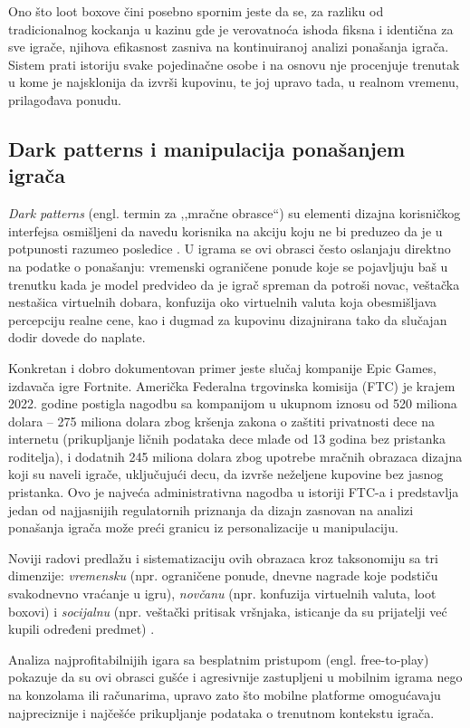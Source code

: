 \documentclass[12pt]{article}
\begin{document}
Ono što loot boxove čini posebno spornim jeste da se, za razliku od tradicionalnog kockanja u kazinu gde je verovatnoća ishoda fiksna i identična za sve igrače, njihova efikasnost zasniva na kontinuiranoj analizi ponašanja igrača. Sistem prati istoriju svake pojedinačne osobe i na osnovu nje procenjuje trenutak u kome je najsklonija da izvrši kupovinu, te joj upravo tada, u realnom vremenu, prilagođava ponudu.
\subsection{Dark patterns i manipulacija ponašanjem igrača}

\textit{Dark patterns} (engl. termin za ,,mračne obrasce``) su elementi dizajna korisničkog interfejsa osmišljeni da navedu korisnika na akciju koju ne bi preduzeo da je u potpunosti razumeo posledice \cite{ftc2022}. U igrama se ovi obrasci često oslanjaju direktno na podatke o ponašanju: vremenski ograničene ponude koje se pojavljuju baš u trenutku kada je model predvideo da je igrač spreman da potroši novac, veštačka nestašica virtuelnih dobara, konfuzija oko virtuelnih valuta koja obesmišljava percepciju realne cene, kao i dugmad za kupovinu dizajnirana tako da slučajan dodir dovede do naplate.

Konkretan i dobro dokumentovan primer jeste slučaj kompanije Epic Games, izdavača igre Fortnite. Američka Federalna trgovinska komisija (FTC) je krajem 2022. godine postigla nagodbu sa kompanijom u ukupnom iznosu od 520 miliona dolara -- 275 miliona dolara zbog kršenja zakona o zaštiti privatnosti dece na internetu (prikupljanje ličnih podataka dece mlađe od 13 godina bez pristanka roditelja), i dodatnih 245 miliona dolara zbog upotrebe mračnih obrazaca dizajna koji su naveli igrače, uključujući decu, da izvrše neželjene kupovine bez jasnog pristanka. Ovo je najveća administrativna nagodba u istoriji FTC-a i predstavlja jedan od najjasnijih regulatornih priznanja da dizajn zasnovan na analizi ponašanja igrača može preći granicu iz personalizacije u manipulaciju.

Noviji radovi predlažu i sistematizaciju ovih obrazaca kroz taksonomiju sa tri dimenzije: \textit{vremensku} (npr. ograničene ponude, dnevne nagrade koje podstiču svakodnevno vraćanje u igru), \textit{novčanu} (npr. konfuzija virtuelnih valuta, loot boxovi) i \textit{socijalnu} (npr. veštački pritisak vršnjaka, isticanje da su prijatelji već kupili određeni predmet) \cite{darkpatterns2026}.

Analiza najprofitabilnijih igara sa besplatnim pristupom (engl. free-to-play) pokazuje da su ovi obrasci gušće i agresivnije zastupljeni u mobilnim igrama nego na konzolama ili računarima, upravo zato što mobilne platforme omogućavaju najpreciznije i najčešće prikupljanje podataka o trenutnom kontekstu igrača.
\end{document}
